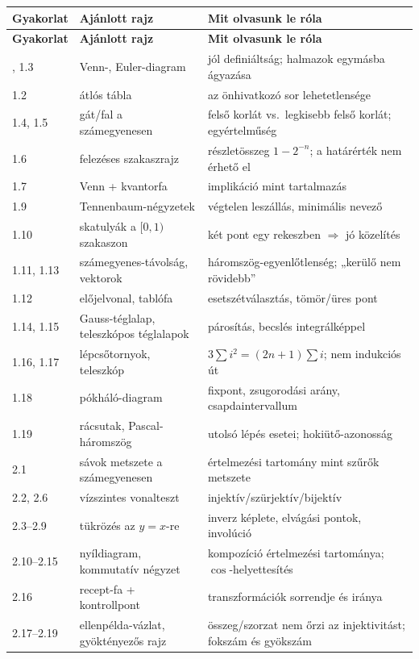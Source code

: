 \documentclass[11pt,a4paper]{article}
\theoremstyle{definition}
\begin{document}
\begingroup
\small
\begin{longtable}{@{}p{2.2cm}p{5.0cm}p{7.6cm}@{}}
\toprule
\textbf{Gyakorlat} & \textbf{Ajánlott rajz} & \textbf{Mit olvasunk le róla} \\
\midrule
\endfirsthead
\toprule
\textbf{Gyakorlat} & \textbf{Ajánlott rajz} & \textbf{Mit olvasunk le róla} \\
\midrule
\endhead
\bottomrule
\endfoot
1.1, 1.3 & Venn-, Euler-diagram & jól definiáltság; halmazok egymásba ágyazása \\
1.2 & átlós tábla & az önhivatkozó sor lehetetlensége \\
1.4, 1.5 & gát/fal a számegyenesen & felső korlát vs.\ legkisebb felső korlát; egyértelműség \\
1.6 & felezéses szakaszrajz & részletösszeg $1-2^{-n}$; a határérték nem érhető el \\
1.7 & Venn + kvantorfa & implikáció mint tartalmazás \\
1.9 & Tennenbaum-négyzetek & végtelen leszállás, minimális nevező \\
1.10 & skatulyák a $[0,1)$ szakaszon & két pont egy rekeszben $\Rightarrow$ jó közelítés \\
1.11, 1.13 & számegyenes-távolság, vektorok & háromszög-egyenlőtlenség; „kerülő nem rövidebb” \\
1.12 & előjelvonal, tablófa & esetszétválasztás, tömör/üres pont \\
1.14, 1.15 & Gauss-téglalap, teleszkópos téglalapok & párosítás, becslés integrálképpel \\
1.16, 1.17 & lépcsőtornyok, teleszkóp & $3\sum i^2=(2n+1)\sum i$; nem indukciós út \\
1.18 & pókháló-diagram & fixpont, zsugorodási arány, csapdaintervallum \\
1.19 & rácsutak, Pascal-háromszög & utolsó lépés esetei; hokiütő-azonosság \\
2.1 & sávok metszete a számegyenesen & értelmezési tartomány mint szűrők metszete \\
2.2, 2.6 & vízszintes vonalteszt & injektív/szürjektív/bijektív \\
2.3--2.9 & tükrözés az $y=x$-re & inverz képlete, elvágási pontok, involúció \\
2.10--2.15 & nyíldiagram, kommutatív négyzet & kompozíció értelmezési tartománya; $\cos$-helyettesítés \\
2.16 & recept-fa + kontrollpont & transzformációk sorrendje és iránya \\
2.17--2.19 & ellenpélda-vázlat, gyöktényezős rajz & összeg/szorzat nem őrzi az injektivitást; fokszám és gyökszám \\

\end{longtable}
\end{document}

